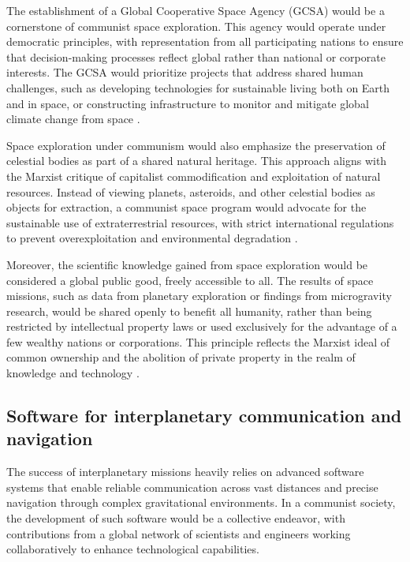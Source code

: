 The establishment of a Global Cooperative Space Agency (GCSA) would be a cornerstone of communist space exploration. This agency would operate under democratic principles, with representation from all participating nations to ensure that decision-making processes reflect global rather than national or corporate interests. The GCSA would prioritize projects that address shared human challenges, such as developing technologies for sustainable living both on Earth and in space, or constructing infrastructure to monitor and mitigate global climate change from space \cite[pp.~145-147]{gagarin1968}.

Space exploration under communism would also emphasize the preservation of celestial bodies as part of a shared natural heritage. This approach aligns with the Marxist critique of capitalist commodification and exploitation of natural resources. Instead of viewing planets, asteroids, and other celestial bodies as objects for extraction, a communist space program would advocate for the sustainable use of extraterrestrial resources, with strict international regulations to prevent overexploitation and environmental degradation \cite[pp.~102-104]{marx1973}.

Moreover, the scientific knowledge gained from space exploration would be considered a global public good, freely accessible to all. The results of space missions, such as data from planetary exploration or findings from microgravity research, would be shared openly to benefit all humanity, rather than being restricted by intellectual property laws or used exclusively for the advantage of a few wealthy nations or corporations. This principle reflects the Marxist ideal of common ownership and the abolition of private property in the realm of knowledge and technology \cite[pp.~180-183]{gramsci1971}.

\subsection{Software for interplanetary communication and navigation}

The success of interplanetary missions heavily relies on advanced software systems that enable reliable communication across vast distances and precise navigation through complex gravitational environments. In a communist society, the development of such software would be a collective endeavor, with contributions from a global network of scientists and engineers working collaboratively to enhance technological capabilities.

